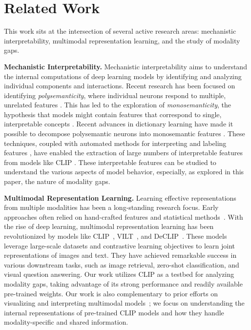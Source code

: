 \section{Related Work}

This work sits at the intersection of several active research areas: mechanistic interpretability, multimodal representation learning, and the study of modality gaps.  

\textbf{Mechanistic Interpretability.}
Mechanistic interpretability aims to understand the internal computations of deep learning models by identifying and analyzing individual components and interactions. Recent research has been focused on identifying \textit{polysemanticity}, where individual neurons respond to multiple, unrelated features \citep{olah2020zoom}. This has led to the exploration of \textit{monosemanticity}, the hypothesis that models might contain features that correspond to single, interpretable concepts \citep{elhage2022solu}. 
Recent advances in dictionary learning have made it possible to decompose polysemantic neurons into monosemantic features \citep{cunningham2023sparse}. These techniques, coupled with automated methods for interpreting and labeling features \citep{bills2023language, Gurnee2023FindingNI, Yan2024EncourageOI}, have enabled the extraction of large numbers of interpretable features from models like CLIP \citep{radford2021learning}. These interpretable features can be studied to understand 
the various aspects of model behavior, especially, as explored in this paper, the nature of modality gaps.

\textbf{Multimodal Representation Learning.}
Learning effective representations from multiple modalities has been a long-standing research focus. Early approaches often relied on hand-crafted features and statistical methods~\citep{ngiam2011multimodal}. With the rise of deep learning, multimodal representation learning has been revolutionized by models like CLIP~\citep{radford2021learning},  VILT~\citep{kim2021vilt}, and DeCLIP~\citep{li2022supervision}. These models leverage large-scale datasets and contrastive learning objectives to learn joint representations of images and text. They have achieved remarkable success in various downstream tasks, such as image retrieval, zero-shot classification, and visual question answering. Our work utilizes CLIP as a testbed for analyzing modality gaps, taking advantage of its strong performance and readily available pre-trained weights. Our work is also complementary to prior efforts on visualizing and interpreting multimodal models~\citep{liang2022multiviz,wang2021m2lens}; we focus on understanding the internal representations of pre-trained CLIP models and how they handle modality-specific and shared information.

